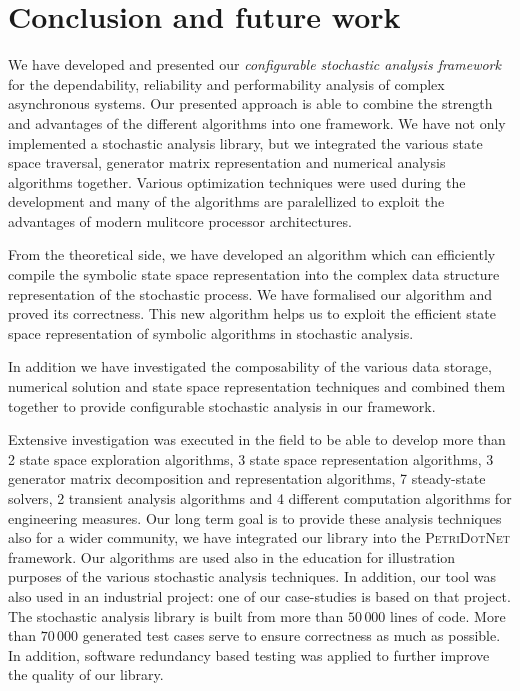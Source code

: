 \chapter{Conclusion and future work}
\label{chap:conclusion}

We have developed and presented our \emph{configurable stochastic
  analysis framework} for the dependability, reliability and
performability analysis of complex asynchronous systems.  Our
presented approach is able to combine the strength and advantages of
the different algorithms into one framework.  We have not only
implemented a stochastic analysis library, but we integrated the
various state space traversal, generator matrix representation and
numerical analysis algorithms together. Various optimization
techniques were used during the development and many of the algorithms
are paralellized to exploit the advantages of modern mulitcore
processor architectures.

From the theoretical side, we have developed an algorithm which can
efficiently compile the symbolic state space representation into the
complex data structure representation of the stochastic process. We
have formalised our algorithm and proved its correctness. 
This new algorithm helps us to exploit the efficient state space
representation of symbolic algorithms in stochastic analysis.

In addition
we have investigated the composability of the various data storage,
numerical solution and state space representation techniques and
combined them together to provide configurable stochastic analysis
in our framework.

Extensive investigation was executed in the field to be able to
develop more than 2 state space exploration algorithms, 3 state space
representation algorithms, 3 generator matrix decomposition and
representation algorithms, 7 steady-state solvers, 2 transient
analysis algorithms and 4 different computation algorithms for
engineering measures.  Our long term goal is to provide these analysis
techniques also for a wider community, we have integrated our library
into the \textsc{PetriDotNet} framework. Our algorithms are used also
in the education for illustration purposes of the various stochastic
analysis techniques. In addition, our tool was also used in an
industrial project: one of our case-studies is based on that project.
The stochastic analysis library is built from more than $50\,000$
lines of code. More than $70\,000$ generated test cases serve to
ensure correctness as much as possible. In addition, software
redundancy based testing was applied to further improve the quality of
our library.

